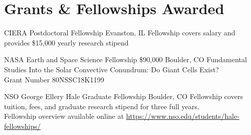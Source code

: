 \section{Grants \& Fellowships Awarded}

		{CIERA Postdoctoral Fellowship}
		{}
		{Evanston, IL}
		{}
		{Fellowship covers salary and provides \$15,000 yearly research stipend}

		{NASA Earth and Space Science Fellowship}
		{\$90,000}
		{Boulder, CO}
		{}
		{Fundamental Studies Into the Solar Convective Conundrum: Do Giant Cells Exist?\\
		 Grant Number 80NSSC18K1199}

		{NSO George Ellery Hale Graduate Fellowship}
		{}
		{Boulder, CO}
		{}
		{Fellowship covers tuition, fees, and graduate research stipend for three full years.\\
		 Fellowship overview available online at \href{https://www.nso.edu/students/hale-fellowships/}{https://www.nso.edu/students/hale-fellowships/}}
